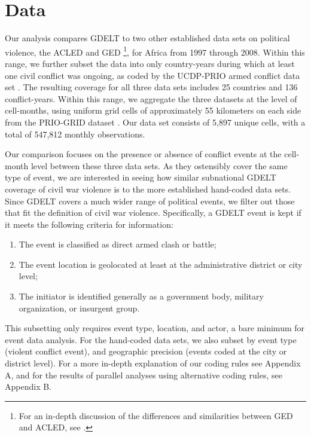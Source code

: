 \documentclass[hidelinks]{article}
\begin{document}
\section*{Data}

Our analysis compares GDELT to two other established data sets on political violence, the ACLED \citep{raleigh10acled} and GED \citep{sundberg13introducing}\footnote{For an in-depth discussion of the differences and similarities between GED and ACLED, see \citep{eck12ged}.}, for Africa from 1997 through 2008. Within this range, we further subset the data into only country-years during which at least one civil conflict was ongoing, as coded by the UCDP-PRIO armed conflict data set \citep{themner13armed}. The resulting coverage for all three data sets includes 25 countries and 136 conflict-years. Within this range, we aggregate the three datasets at the level of cell-months, using uniform grid cells of approximately 55 kilometers on each side from the PRIO-GRID dataset \citep{tollefsen12priogrid}. Our data set consists of 5,897 unique cells, with a total of 547,812 monthly observations.

Our comparison focuses on the presence or absence of conflict events at the cell-month level between these three data sets. As they ostensibly cover the same type of event, we are interested in seeing how similar subnational GDELT coverage of civil war violence is to the more established hand-coded data sets. Since GDELT covers a much wider range of political events, we filter out those that fit the definition of civil war violence. Specifically, a GDELT event is kept if it meets the following criteria for information:
\begin{enumerate}
\item The event is classified as direct armed clash or battle;
\item The event location is geolocated at least at the administrative district or city level;
\item The initiator is identified generally as a government body, military organization, or insurgent group.
\end{enumerate}
This subsetting only requires event type, location, and actor, a bare minimum for event data analysis. For the hand-coded data sets, we also subset by event type (violent conflict event), and geographic precision (events coded at the city or district level). For a more in-depth explanation of our coding rules see Appendix A, and for the results of parallel analyses using alternative coding rules, see Appendix B. 
\end{document}
